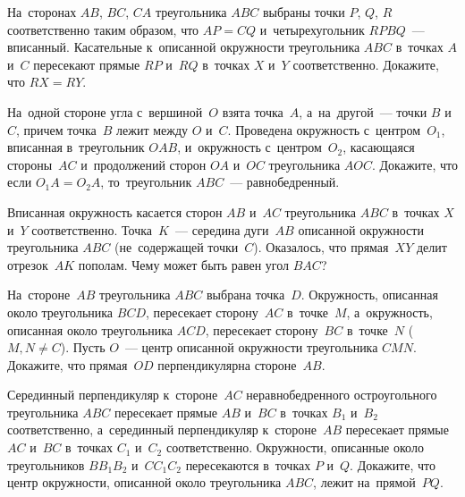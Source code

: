 


\begin{problems}

\item
На~сторонах $AB$, $BC$, $CA$ треугольника $ABC$ выбраны точки $P$, $Q$, $R$
соответственно таким образом, что $AP = CQ$ и~четырехугольник $RPBQ$~---
вписанный.
Касательные к~описанной окружности треугольника $ABC$ в~точках $A$ и~$C$
пересекают прямые $RP$ и~$RQ$ в~точках $X$ и~$Y$ соответственно.
Докажите, что $RX = RY$.

\item
На~одной стороне угла с~вершиной~$O$ взята точка~$A$, а~на~другой~--- точки $B$
и~$C$, причем точка~$B$ лежит между $O$ и~$C$.
Проведена окружность с~центром~$O_1$, вписанная в~треугольник $OAB$,
и~окружность с~центром~$O_2$, касающаяся стороны~$AC$ и~продолжений
сторон $OA$ и~$OC$ треугольника $AOC$.
Докажите, что если $O_1 A = O_2 A$, то~треугольник $ABC$~--- равнобедренный.

\item
Вписанная окружность касается сторон $AB$ и~$AC$ треугольника $ABC$
в~точках $X$ и~$Y$ соответственно.
Точка~$K$~--- середина дуги~$AB$ описанной окружности треугольника $ABC$
(не~содержащей точки~$C$).
Оказалось, что прямая~$XY$ делит отрезок~$AK$ пополам.
Чему может быть равен угол $BAC$?

\item
На~стороне~$AB$ треугольника $ABC$ выбрана точка~$D$.
Окружность, описанная около треугольника $BCD$, пересекает сторону~$AC$
в~точке~$M$, а~окружность, описанная около треугольника $ACD$, пересекает
сторону~$BC$ в~точке~$N$ ($M, N \neq C$).
Пусть $O$~--- центр описанной окружности треугольника $CMN$.
Докажите, что прямая~$OD$ перпендикулярна стороне~$AB$.

\item
Серединный перпендикуляр к~стороне~$AC$ неравнобедренного остроугольного
треугольника $ABC$ пересекает прямые $AB$ и~$BC$ в~точках $B_1$ и~$B_2$
соответственно, а~серединный перпендикуляр к~стороне~$AB$ пересекает
прямые $AC$ и~$BC$ в~точках $C_1$ и~$C_2$ соответственно.
Окружности, описанные около треугольников $B B_1 B_2$ и~$C C_1 C_2$
пересекаются в~точках $P$ и~$Q$.
Докажите, что центр окружности, описанной около треугольника $ABC$, лежит
на~прямой~$PQ$.


\end{problems}
